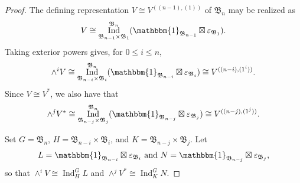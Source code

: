 \documentclass[12pt]{amsart}
\theoremstyle{plain}
\theoremstyle{definition}
\DeclareMathOperator{\Ind}{Ind}
\begin{document}
\begin{proof}
The defining representation $V \cong V^{((n-1),(1))}$ of $\mathfrak{B}_n$ may be realized as
\begin{equation}
    V \cong \Ind_{\mathfrak{B}_{n-1} \times \mathfrak{B}_1}^{\mathfrak{B}_n} ( \mathbbm{1}_{\mathfrak{B}_{n-1}} \boxtimes \varepsilon_{\mathfrak{B}_1}).
\end{equation}
Taking exterior powers gives, for $0 \leq i \leq n$,
\begin{equation}
    \wedge^i V \cong \Ind_{\mathfrak{B}_{n-i} \times \mathfrak{B}_i}^{\mathfrak{B}_n} ( \mathbbm{1}_{\mathfrak{B}_{n-i}} \boxtimes \varepsilon_{\mathfrak{B}_i}) \cong V^{((n-i),(1^i))}.
\end{equation}
Since $V \cong V^*$, we also have that 
\begin{equation}
    \wedge^j V^* \cong \Ind_{\mathfrak{B}_{n-j} \times \mathfrak{B}_j}^{\mathfrak{B}_n} ( \mathbbm{1}_{\mathfrak{B}_{n-j}} \boxtimes \varepsilon_{\mathfrak{B}_j}) \cong V^{((n-j),(1^j))}.
\end{equation}

Set $G  = \mathfrak{B}_n$, $H = \mathfrak{B}_{n-i}\times \mathfrak{B}_{i}$, and $K =  \mathfrak{B}_{n-j} \times \mathfrak{B}_{j}$.
Let
    \begin{equation}
        L = \mathbbm{1}_{\mathfrak{B}_{n-i}} \boxtimes \varepsilon_{\mathfrak{B}_i} \text{ and } N = \mathbbm{1}_{\mathfrak{B}_{n-j}} \boxtimes \varepsilon_{\mathfrak{B}_j},
    \end{equation}
so that $\wedge^i V \cong \Ind_H^G L$ and $\wedge^j V^* \cong \Ind_K^G N$.


\end{proof}
\end{document}
